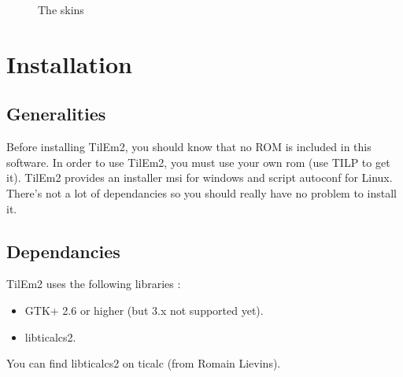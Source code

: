 \documentclass[10pt]{report}
\begin{document}
\begin{figure}[H]
\centering
{}
\caption{The skins}
\end{figure}

\chapter{Installation}
\section{Generalities}
Before installing TilEm2, you should know that no ROM is included in this software.\newline
In order to use TilEm2, you must use your own rom (use TILP to get it).\newline
TilEm2 provides an installer msi for windows and script autoconf for Linux.\newline
There's not a lot of dependancies so you should really have no problem to install it.\newline

\section{Dependancies}
TilEm2 uses the following libraries :\newline
\begin{itemize}
\item	GTK+ 2.6 or higher (but 3.x not supported yet).
\item	libticalcs2.
\end{itemize}
You can find libticalcs2 on ticalc (from Romain Lievins).\newline
\end{document}
